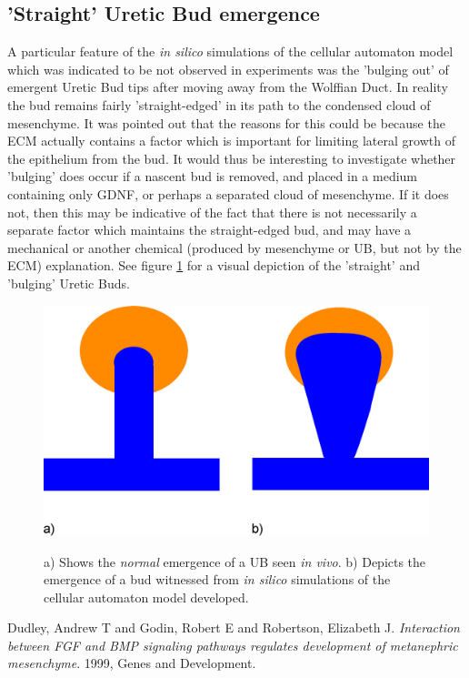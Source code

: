 \documentclass[pdftex,10pt,a4paper]{article}
\begin{document}
\subsection{'Straight' Uretic Bud emergence}
A particular feature of the \textit{in silico} simulations of the cellular automaton model which was indicated to be not observed in experiments was the 'bulging out' of emergent Uretic Bud tips after moving away from the Wolffian Duct. In reality the bud remains fairly 'straight-edged' in its path to the condensed cloud of mesenchyme. It was pointed out that the reasons for this could be because the ECM actually contains a factor which is important for limiting lateral growth of the epithelium from the bud. It would thus be interesting to investigate whether 'bulging' does occur if a nascent bud is removed, and placed in a medium containing only GDNF, or perhaps a separated cloud of mesenchyme. If it does not, then this may be indicative of the fact that there is not necessarily a separate factor which maintains the straight-edged bud, and may have a mechanical or another chemical (produced by mesenchyme or UB, but not by the ECM) explanation. See figure \ref{fig:straight} for a visual depiction of the 'straight' and 'bulging' Uretic Buds.

\begin{figure}[t] 
\centering
\scalebox{0.25} 
{\includegraphics{experiments_6.eps}}
\caption{a) Shows the \textit{normal} emergence of a UB seen \textit{in vivo}. b) Depicts the emergence of a bud witnessed from \textit{in silico} simulations of the cellular automaton model developed.} \label{fig:straight}
\end{figure} 


\begin{thebibliography}{9}

Dudley, Andrew T and Godin, Robert E and Robertson, Elizabeth J.
\emph{Interaction between FGF and BMP signaling pathways regulates development of metanephric mesenchyme}. 1999, Genes and Development.
\end{thebibliography}
\end{document}

